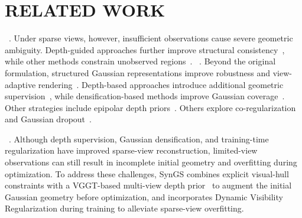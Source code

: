 \section{RELATED WORK}
\label{sec:related}

~\cite{Mildenhall21_NeRF}. Under sparse views, however, insufficient observations cause severe geometric ambiguity. Depth-guided approaches further improve structural consistency~\cite{Wang23_SparseNeRF}, while other methods constrain unobserved regions~\cite{Niemeyer22_RegNeRF}. ~\cite{Kerbl23_3DGS}. Beyond the original formulation, structured Gaussian representations improve robustness and view-adaptive rendering~\cite{Lu24_ScaffoldGS}. Depth-based approaches introduce additional geometric supervision~\cite{Li24_DNGaussian}, while densification-based methods improve Gaussian coverage~\cite{Zhu24_FSGS}. Other strategies include epipolar depth priors~\cite{Zheng25_NexusGS}. Others explore co-regularization~\cite{Zhang24_CoRGS} and Gaussian dropout~\cite{Park25_DropGaussian}.

~\cite{Yang24_DepthAnythingV2}. Although depth supervision, Gaussian densification, and training-time regularization have improved sparse-view reconstruction, limited-view observations can still result in incomplete initial geometry and overfitting during optimization. To address these challenges, SynGS combines explicit visual-hull constraints with a VGGT-based multi-view depth prior~\cite{Wang25_VGGT} to augment the initial Gaussian geometry before optimization, and incorporates Dynamic Visibility Regularization during training to alleviate sparse-view overfitting.
